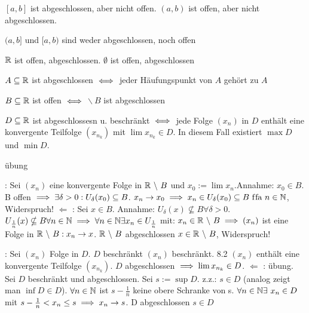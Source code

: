 \documentclass[a4paper,oneside,DIV15,BCOR12mm]{scrbook}
\begin{document}
\begin{beispiele}
\item $[a, b]$ ist abgeschlossen, aber nicht offen. $(a, b)$ ist offen, aber nicht abgeschlossen.
\item $(a, b]$ und $[a, b)$ sind weder abgeschlossen, noch offen
\item $\mathbb{R}$ ist offen, abgeschlossen. $\emptyset$ ist offen, abgeschlossen
\end{beispiele}


\begin{hilfssatz*}
\begin{liste}
\item $A \subseteq \mathbb{R}$ ist abgeschlossen $\iff$ jeder Häufungspunkt von $A$ gehört zu $A$
\item $B \subseteq \mathbb{R}$ ist offen $\iff$ \MdR$ \backslash\ B$ ist abgeschlossen
\item $D \subseteq \mathbb{R}$ ist abgeschlossesn u. beschränkt $\iff$ jede Folge $(x_n)$ in $D$ enthält eine konvergente Teilfolge $(x_{n_k})$ mit $\lim x_{n_k} \in D$. In diesem Fall existiert $\max D$ und $\min D$.
\end{liste}
\end{hilfssatz*}

\begin{beweis}
\begin{liste}
\item übung
\item \glqq \folgt \grqq: Sei $(x_n)$ eine konvergente Folge in $\MdR\ \backslash\ B$ und $x_0:=\lim x_n$.Annahme: $x_0 \in B$. B offen $\implies \exists \delta>0 : U_\delta(x_0) \subseteq B$. $x_n \to x_0 \implies x_n \in U_\delta(x_0) \subseteq B \text{ f\/fa } n \in\mathbb{N}$, Widerspruch! \glqq $\Leftarrow$ \grqq: Sei $x \in B$. Annahme: $U_\delta(x) \nsubseteq B \forall \delta>0$. 
\folgt $U_{\frac{1}{n}}(x) \nsubseteq B \forall n \in \mathbb{N} 
\implies \forall n \in \mathbb{N} \exists x_n \in U_{\frac{1}{n}}$ mit: $x_n \in \mathbb{R}\ \backslash\ B \implies (x_n)$ ist eine Folge in $\MdR\ \backslash\ B: x_n \to x$. $\MdR\ \backslash\ B$ abgeschlossen \folgt $x \in \mathbb{R}\ \backslash\ B$, Widerspruch!
\item \glqq \folgt \grqq: Sei $(x_n)$ Folge in $D$. $D$ beschränkt \folgt $(x_n)$ beschränkt. 8.2 \folgt $(x_n)$ enthält eine konvergente Teilfolge $(x_{n_k})$. $D$ abgeschlossen $\implies \lim x_{n_k} \in D$. \glqq $\Leftarrow$ \grqq: übung. Sei $D$ beschränkt und abgeschlossen. Sei $s:=\sup D$. z.z.: $s \in D$ (analog zeigt man $\inf D \in D$). $\forall n \in \mathbb{N}$ ist $s-\frac{1}{n}$ keine obere Schranke von s. \folgt $\forall n \in\mathbb{N}\exists\ x_n \in D$ mit $s - \frac{1}{n} < x_n \le s \implies x_n \to s$. D abgeschlossen \folgt $s \in D$
\end{liste}
\end{beweis}
\end{document}
